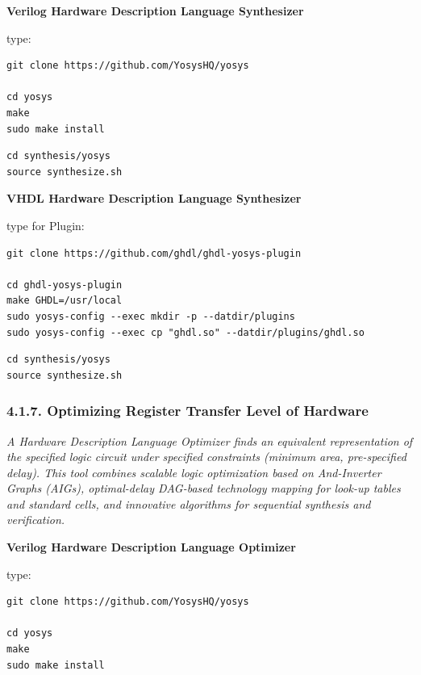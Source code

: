 \documentclass[
]{article}
\begin{document}
\textbf{Verilog Hardware Description Language Synthesizer}

type:

\begin{verbatim}
git clone https://github.com/YosysHQ/yosys

cd yosys
make
sudo make install
\end{verbatim}

\begin{verbatim}
cd synthesis/yosys
source synthesize.sh
\end{verbatim}

\textbf{VHDL Hardware Description Language Synthesizer}

type for Plugin:

\begin{verbatim}
git clone https://github.com/ghdl/ghdl-yosys-plugin

cd ghdl-yosys-plugin
make GHDL=/usr/local
sudo yosys-config --exec mkdir -p --datdir/plugins
sudo yosys-config --exec cp "ghdl.so" --datdir/plugins/ghdl.so
\end{verbatim}

\begin{verbatim}
cd synthesis/yosys
source synthesize.sh
\end{verbatim}

\hypertarget{optimizing-register-transfer-level-of-hardware-1}{%
\subsubsection{4.1.7. Optimizing Register Transfer Level of
Hardware}\label{optimizing-register-transfer-level-of-hardware-1}}

\emph{A Hardware Description Language Optimizer finds an equivalent
representation of the specified logic circuit under specified
constraints (minimum area, pre-specified delay). This tool combines
scalable logic optimization based on And-Inverter Graphs (AIGs),
optimal-delay DAG-based technology mapping for look-up tables and
standard cells, and innovative algorithms for sequential synthesis and
verification.}

\textbf{Verilog Hardware Description Language Optimizer}

type:

\begin{verbatim}
git clone https://github.com/YosysHQ/yosys

cd yosys
make
sudo make install
\end{verbatim}
\end{document}
